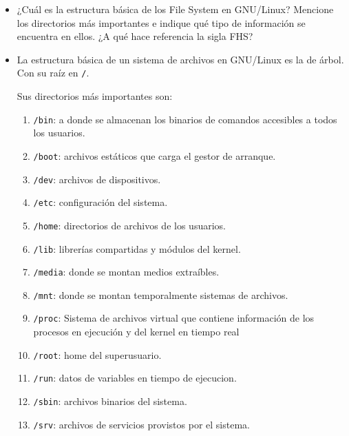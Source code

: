 \documentclass[10pt,a4paper]{paper}
\begin{document}
	
	\begin{itemize}
		\item ¿Cuál es la estructura básica de los File System en GNU/Linux? Mencione
		los directorios más importantes e indique qué tipo de información se encuentra
		en	ellos. ¿A qué hace referencia la sigla FHS?
		
		\item La estructura básica de un sistema de archivos en GNU/Linux es la de
		árbol. Con su raíz en \texttt{/}. 
		
		Sus directorios más importantes son:
		\begin{enumerate}
			\item \texttt{/bin}: a donde se almacenan los binarios de comandos accesibles
			a todos los usuarios.
			
			\item \texttt{/boot}: archivos estáticos que carga el gestor de arranque.
			
			\item \texttt{/dev}: archivos de dispositivos.
			
			\item \texttt{/etc}: configuración del sistema.
			
			\item \texttt{/home}: directorios de archivos de los usuarios.
			
			\item \texttt{/lib}: librerías compartidas y módulos del kernel.
			
			\item \texttt{/media}: donde se montan medios extraíbles.
			
			\item \texttt{/mnt}: donde se montan temporalmente sistemas de archivos.
			
			\item \texttt{/proc}: Sistema de archivos virtual que contiene información de
			los procesos en ejecución y del kernel en tiempo real 
			
			\item \texttt{/root}: home del superusuario.
			
			\item \texttt{/run}: datos de variables en tiempo de ejecucion.
			
			\item \texttt{/sbin}: archivos binarios del sistema.
			
			\item \texttt{/srv}: archivos de servicios provistos por el sistema.
			

\end{enumerate}
\end{itemize}
\end{document}
